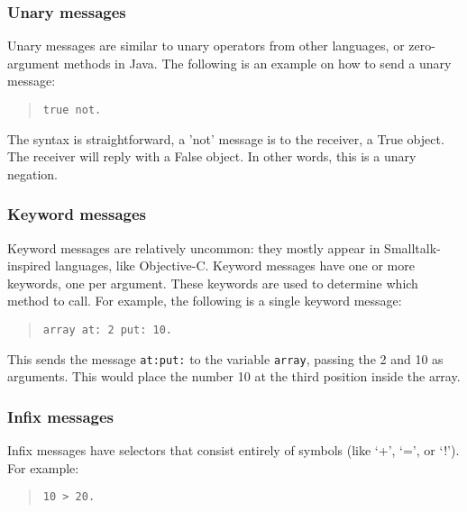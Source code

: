 \documentclass[a4paper]{article}
\begin{document}
\subsubsection{Unary messages}

Unary messages are similar to unary operators from other languages, or zero-argument methods in Java.
The following is an example on how to send a unary message:

\begin{quote}
\begin{lstlisting}
true not.
\end{lstlisting}
\end{quote}

The syntax is straightforward, a 'not' message is to the receiver, a True object.
The receiver will reply with a False object. In other words, this is a unary negation.

\subsubsection{Keyword messages}

Keyword messages are relatively uncommon: they mostly appear in Smalltalk-inspired languages, like Objective-C.
Keyword messages have one or more keywords, one per argument.
These keywords are used to determine which method to call.
For example, the following is a single keyword message:

\begin{quote}
\begin{lstlisting}
array at: 2 put: 10.
\end{lstlisting}
\end{quote}

This sends the message \texttt{at:put:} to the variable \texttt{array}, passing the 2 and 10 as arguments. This would place the number 10 at the third position inside the array.



\subsubsection{Infix messages}

Infix messages have selectors that consist entirely of symbols (like `+', `=', or `!'). For example:

\begin{quote}
\begin{lstlisting}
10 > 20.
\end{lstlisting}
\end{quote}
\end{document}
